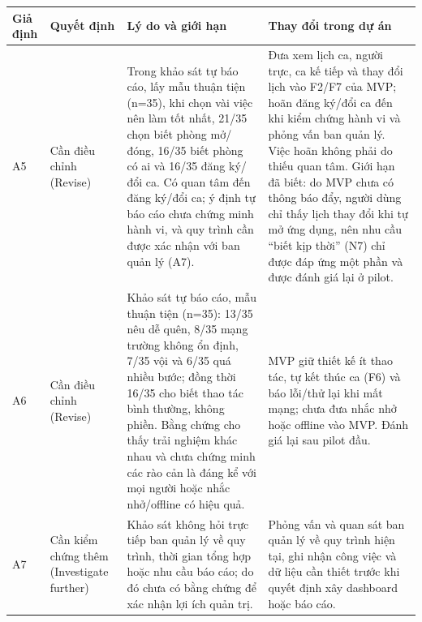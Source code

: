 {\centering
\begin{tabularx}{0.94\textwidth}{|>{\raggedright\arraybackslash}p{}|>{\raggedright\arraybackslash}p{}|>{\raggedright\arraybackslash}p{}|X|}
\hline
\textbf{Giả định} & \textbf{Quyết định} & \textbf{Lý do và giới hạn} & \textbf{Thay đổi trong dự án} \\ \hline
A5 & Cần điều chỉnh (Revise) & Trong khảo sát tự báo cáo, lấy mẫu thuận tiện (n=35), khi chọn vài việc nên làm tốt nhất, 21/35 chọn biết phòng mở/đóng, 16/35 biết phòng có ai và 16/35 đăng ký/đổi ca. Có quan tâm đến đăng ký/đổi ca; ý định tự báo cáo chưa chứng minh hành vi, và quy trình cần được xác nhận với ban quản lý (A7). & Đưa xem lịch ca, người trực, ca kế tiếp và thay đổi lịch vào F2/F7 của MVP; hoãn đăng ký/đổi ca đến khi kiểm chứng hành vi và phỏng vấn ban quản lý. Việc hoãn không phải do thiếu quan tâm. Giới hạn đã biết: do MVP chưa có thông báo đẩy, người dùng chỉ thấy lịch thay đổi khi tự mở ứng dụng, nên nhu cầu ``biết kịp thời'' (N7) chỉ được đáp ứng một phần và được đánh giá lại ở pilot. \\ \hline
A6 & Cần điều chỉnh (Revise) & Khảo sát tự báo cáo, mẫu thuận tiện (n=35): 13/35 nêu dễ quên, 8/35 mạng trường không ổn định, 7/35 vội và 6/35 quá nhiều bước; đồng thời 16/35 cho biết thao tác bình thường, không phiền. Bằng chứng cho thấy trải nghiệm khác nhau và chưa chứng minh các rào cản là đáng kể với mọi người hoặc nhắc nhở/offline có hiệu quả. & MVP giữ thiết kế ít thao tác, tự kết thúc ca (F6) và báo lỗi/thử lại khi mất mạng; chưa đưa nhắc nhở hoặc offline vào MVP. Đánh giá lại sau pilot đầu. \\ \hline
A7 & Cần kiểm chứng thêm (Investigate further) & Khảo sát không hỏi trực tiếp ban quản lý về quy trình, thời gian tổng hợp hoặc nhu cầu báo cáo; do đó chưa có bằng chứng để xác nhận lợi ích quản trị. & Phỏng vấn và quan sát ban quản lý về quy trình hiện tại, ghi nhận công việc và dữ liệu cần thiết trước khi quyết định xây dashboard hoặc báo cáo. \\ \hline
\end{tabularx}\par}
\normalsize
\setlength{\tabcolsep}{6pt}
\setlength{\extrarowheight}{0pt}
